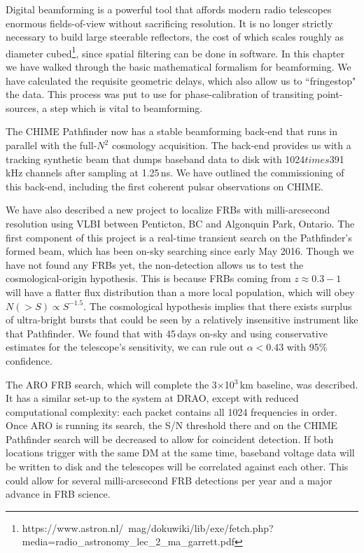 Digital beamforming is a powerful tool that affords modern 
radio telescopes enormous fields-of-view without 
sacrificing resolution. It is no longer strictly necessary 
to build large steerable reflectors, the cost of which scales 
roughly as diameter cubed\footnote{https://www.astron.nl/~mag/dokuwiki/lib/exe/fetch.php?media=radio\_astronomy\_lec\_2\_ma\_garrett.pdf}, 
since spatial filtering can be done in software.
In this chapter 
we have walked through the basic mathematical formalism 
for beamforming. We have calculated the requisite geometric 
delays, which also allow us to ``fringestop" the data. 
This process was 
put to use for phase-calibration of transiting point-sources, 
a step which is vital to beamforming. 

The CHIME Pathfinder now has a stable beamforming back-end
that runs in parallel with the full-$N^2$ cosmology acquisition.
The back-end provides us with a tracking synthetic beam that 
dumps baseband data to disk with 1024$times$391\,kHz channels 
after sampling at 1.25\,ns. We have outlined the commissioning of this 
back-end, including the first coherent pulsar observations on CHIME.

We have also described a new project to localize FRBs with 
milli-arcsecond resolution using VLBI between Penticton, BC 
and Algonquin Park, Ontario. The first component 
of this project is a real-time transient search on the Pathfinder's 
formed beam, which has been on-sky searching since early May 2016. 
Though we have not found any FRBs yet, the non-detection 
allows us to test the cosmological-origin hypothesis. This is 
because FRBs coming from $z\approx0.3-1$ will have a flatter 
flux distribution than a more local population, which 
will obey $N(>S)\propto S^{-1.5}$. The cosmological hypothesis implies that 
there exists surplus of ultra-bright bursts that could be 
seen by a relatively insensitive instrument like that Pathfinder.
We found that with 45\,days on-sky and using conservative 
estimates for the telescope's sensitivity, we can rule 
out $\alpha < 0.43$ with 95\% confidence. 

The ARO FRB search, which will complete the 3$\times$10$^3$\,km
baseline, was described. It has a similar set-up to the 
system at DRAO, except with reduced computational 
complexity: each packet contains all 1024  
frequencies in order. Once ARO is running its search, the S/N threshold 
there and on the CHIME Pathfinder search will be decreased
to allow for coincident detection. If both locations 
trigger with the same DM at the same time, baseband voltage 
data will be written to disk and the telescopes 
will be correlated against each other. This could 
allow for several milli-arcsecond FRB detections 
per year and a major advance in FRB science.





  

